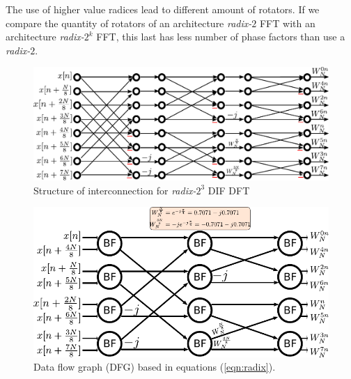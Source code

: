 \documentclass[journal,comsoc]{IEEEtran}
\begin{document}
The use of higher value radices lead to different amount of rotators. If we compare the quantity of rotators of an architecture \textit{radix-}$2$ FFT with an architecture \textit{radix-}$2^k$ FFT, this last has less number of phase factors than use a \textit{radix-}$2$.
\\

\begin{figure}[!t]
	\centering
	\includegraphics[width=\linewidth]{Diagramas/miSeccionFiguras/8PuntosRadix8Conexion}
	\caption{Structure of interconnection for \textit{radix-}$2^3$ DIF DFT}
	\label{fig:8puntosradix8conexion}
\end{figure}
\begin{figure}[t!]
	\centering
	\includegraphics[width=0.95\linewidth]{Diagramas/miSeccionFiguras/8PuntosRadix8Burbujas}
	\caption{Data flow graph (DFG) based in equations (\ref{eqn:radix}).}
	\label{fig:8puntosradix8burbujas}
\end{figure}
\end{document}
